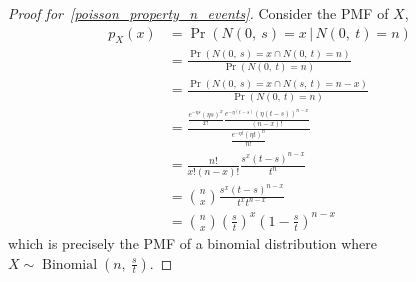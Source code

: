 \documentclass{article}
\begin{document}
\begin{proof}[Proof for~\ref{poisson_property_n_events}]
    Consider the PMF of \(X\),
    \begin{align*}
        p_X\left( x \right) & = \Pr{\left( N\left( 0,\: s \right) = x \,\vert\, N\left( 0,\: t \right) = n \right)}                                                                                                                                 \\
                            & = \frac{\Pr{\left( N\left( 0,\: s \right) = x \cap N\left( 0,\: t \right) = n \right)}}{\Pr{\left( N\left( 0,\: t \right) = n \right)}}                                                                               \\
                            & = \frac{\Pr{\left( N\left( 0,\: s \right) = x \cap N\left( s,\: t \right) = n - x \right)}}{\Pr{\left( N\left( 0,\: t \right) = n \right)}}                                                                           \\
                            & = \frac{\frac{e^{-\eta s} \left( \eta s \right)^x}{x!} \frac{e^{-\eta \left( t - s \right)} \left( \eta \left( t - s \right) \right)^{n - x}}{\left( n - x \right)!}}{\frac{e^{-\eta t} \left( \eta t \right)^n}{n!}} \\
                            & = \frac{n!}{x!\left( n - x \right)!} \frac{s^x \left( t - s \right)^{n - x}}{t^n} \\
                            & = \binom{n}{x} \frac{s^x \left( t - s \right)^{n - x}}{t^x t^{n - x}} \\
                            & = \binom{n}{x} \left( \frac{s}{t} \right)^x \left( 1 - \frac{s}{t} \right)^{n - x} 
    \end{align*}
    which is precisely the PMF of a binomial distribution where \(X \sim \operatorname{Binomial}{\left( n,\: \frac{s}{t} \right)}\).
\end{proof}
\end{document}
